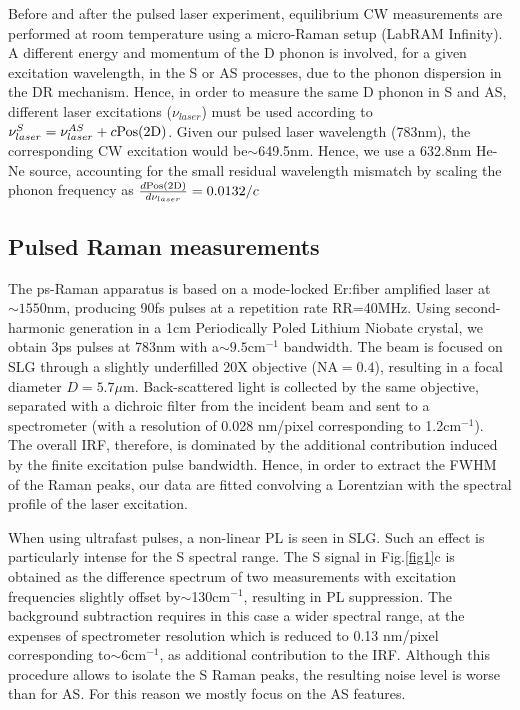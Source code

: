 \documentclass[aps, prl,twocolumn]{revtex4}
\begin{document}
Before and after the pulsed laser experiment, equilibrium CW measurements are performed at room temperature using a micro-Raman setup (LabRAM Infinity). A different energy and momentum of the D phonon is involved, for a given excitation wavelength, in the S or AS processes, due to the phonon dispersion in the DR mechanism\cite{baranov_1987,thomsen_2000}. Hence, in order to measure the same D phonon in S and AS, different laser excitations (${\nu}_{laser}$) must be used according to ${\nu}_{laser}^{S}={\nu}_{laser}^{AS}+c\textnormal{Pos}(\textnormal{2D})$\cite{FerrariNN2013,tan2002,cancado2002}. Given our pulsed laser wavelength (783nm), the corresponding CW excitation would be$\sim$649.5nm. Hence, we use a 632.8nm He-Ne source, accounting for the small residual wavelength mismatch by scaling the phonon frequency as $\frac{d \textnormal{Pos}(\textnormal{2D})}{d {\nu}_{laser}}=0.0132/c$\cite{FerrariNN2013}
\subsection*{Pulsed Raman measurements}

The ps-Raman apparatus is based on a mode-locked Er:fiber amplified laser at$\sim1550$nm, producing 90fs pulses at a repetition rate RR=40MHz. Using second-harmonic generation in a 1cm Periodically Poled Lithium Niobate crystal\cite{Marangoni2007}, we obtain 3ps pulses at 783nm with a$\sim9.5$cm$^{-1}$ bandwidth. The beam is focused on SLG through a slightly underfilled 20X objective (NA$=0.4$), resulting in a focal diameter $D=5.7\mu$m. Back-scattered light is collected by the same objective, separated with a dichroic filter from the incident beam and sent to a spectrometer (with a resolution of 0.028 nm/pixel corresponding to 1.2cm$^{-1}$). The overall IRF, therefore, is dominated by the additional contribution induced by the finite excitation pulse bandwidth. Hence, in order to extract the FWHM of the Raman peaks, our data are fitted convolving a Lorentzian with the spectral profile of the laser excitation.

When using ultrafast pulses, a non-linear PL is seen in SLG\cite{Lui2010}. Such an effect is particularly intense for the S spectral range\cite{PhysRevB.82.081408,Stohr2010}. The S signal in Fig.\ref{fig1}c is obtained as the difference spectrum of two measurements with excitation frequencies slightly offset by$\sim$130cm$^{-1}$, resulting in PL suppression. The background subtraction requires in this case a wider spectral range, at the expenses of spectrometer resolution which is reduced to 0.13 nm/pixel corresponding to$\sim$6cm$^{-1}$, as additional contribution to the IRF. Although this procedure allows to isolate the S Raman peaks, the resulting noise level is worse than for AS. For this reason we mostly focus on the AS features.
\end{document}
